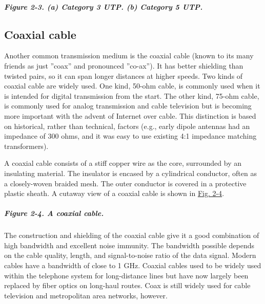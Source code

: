 \documentclass[b5paper,11pt]{memoir}
\begin{document}
\subparagraph[Figure 2-3. (a) Category 3 UTP. (b) Category 5
UTP.]{\texorpdfstring{\protect\hypertarget{0130661023_ch02lev1sec2.htmlux5cux23ch02fig03}{}{}Figure
2-3. (a) Category 3 UTP. (b) Category 5
UTP.}{Figure 2-3. (a) Category 3 UTP. (b) Category 5 UTP.}}


\protect\hypertarget{0130661023_ch02lev1sec2.htmlux5cux23ch02lev2sec6}{}{}

\subsection{Coaxial cable}

Another common transmission medium is the {coaxial cable} (known to its
many friends as just ''coax'' and pronounced ''co-ax''). It has better
shielding than twisted pairs, so it can span longer distances at higher
speeds. Two kinds of coaxial cable are widely used. One kind, 50-ohm
cable, is commonly used when it is intended for digital transmission
from the start. The other kind, 75-ohm cable, is commonly used for
analog transmission and cable television but is becoming more important
with the advent of Internet over cable. This distinction is based on
historical, rather than technical, factors (e.g., early dipole antennas
had an impedance of 300 ohms, and it was easy to use existing 4:1
impedance matching transformers).

A coaxial cable consists of a stiff copper wire as the core, surrounded
by an insulating material. The insulator is encased by a cylindrical
conductor, often as a closely-woven braided mesh. The outer conductor is
covered in a protective plastic sheath. A cutaway view of a coaxial
cable is shown in
\protect\hyperlink{0130661023_ch02lev1sec2.htmlux5cux23ch02fig04}{Fig.
2-4}.

\subparagraph[Figure 2-4. A coaxial
cable.]{\texorpdfstring{\protect\hypertarget{0130661023_ch02lev1sec2.htmlux5cux23ch02fig04}{}{}Figure
2-4. A coaxial cable.}{Figure 2-4. A coaxial cable.}}


The construction and shielding of the coaxial cable give it a good
combination of high bandwidth and excellent noise immunity. The
bandwidth possible depends on the cable quality, length, and
signal-to-noise ratio of the data signal. Modern cables have a bandwidth
of close to 1 GHz. Coaxial cables used to be widely used within the
telephone system for long-distance lines but have now largely been
replaced by fiber optics on long-haul routes. Coax is still widely used
for cable television and metropolitan area networks, however.
\end{document}
